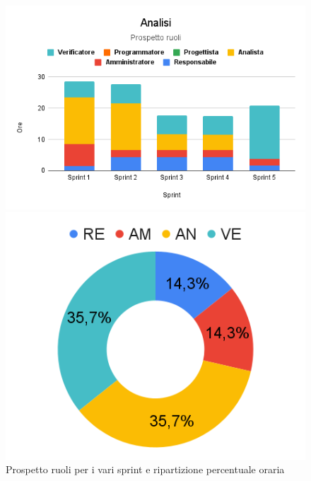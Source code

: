 \begin{figure}[h!]
	\centering
	\begin{minipage}[c]{0.4\textwidth}
    	\includegraphics[scale=0.55]{../../assets/Diagrammi_Excel/Analisi.png}
	\end{minipage}
\hfill
	\begin{minipage}[c]{0.3\textwidth}
		\includegraphics[scale=0.32]{../../assets/Diagrammi_Excel/Rip_An.png}
	\end{minipage}
	\caption{Prospetto ruoli per i vari sprint e ripartizione percentuale oraria}
\end{figure}



\newpage

